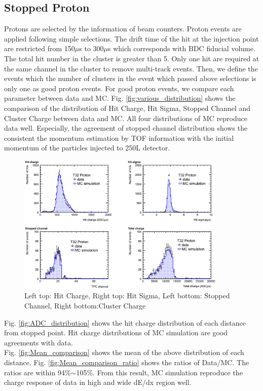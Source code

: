 \subsection{Stopped Proton}

Protons are selected by the information of beam counters.
Proton events are applied following simple selections.
The drift time of the hit at the injection point are restricted from 150$\mu$s to 300$\mu$s which corresponds with BDC fiducial volume.
The total hit number in the cluster is greater than 5.
Only one hit are required at the same channel in the cluster to remove multi-track events.
Then, we define the events which the number of clusters in the event which passed above selections is only one as good proton events.
For good proton events, we compare each parameter between data and MC.
Fig. \ref{fig:various_distribution} shows the comparison of the distribution of Hit Charge, Hit Sigma, Stopped Channel and  Cluster Charge between data and MC.
All four distributions of MC reproduce data well.
Especially, the agreement of stopped channel distribution shows the consistent the momentum estimation by TOF information with the initial momentum of the particles injected to 250L detector.\\

\begin{figure}[htbp]
  \centering
  \includegraphics[width=10cm,clip]{./fig/stop_proton1.eps}
  \caption{Left top: Hit Charge, Right top: Hit Sigma, Left bottom: Stopped Channel, Right bottom:Cluster Charge}
  \label{fig:varios_distribution}
\end{figure}

Fig. \ref{fig:ADC_distribution} shows the hit charge distribution of each distance from stopped point.
Hit charge distributions of MC simulation are good agreements with data.\\
Fig. \ref{fig:Mean_comparison} shows the mean of the above distribution of each distance.
Fig. \ref{fig:Mean_comparison_ratio} shows the ratios of Data/MC.
The ratios are within 94\%$\sim$105\%.
From this result, MC simulation reproduce the charge response of data in high and wide dE/dx region well.

